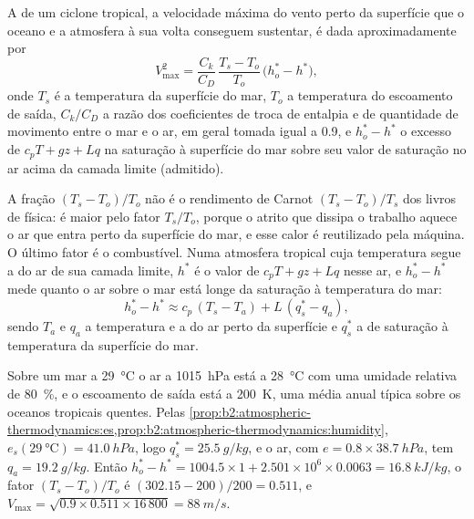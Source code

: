 \begin{proposition}\label{prop:b2:weather-systems:pi}
A \emph{} de um ciclone tropical, a velocidade máxima do vento perto da superfície que
o oceano e a atmosfera à sua volta conseguem sustentar, é dada aproximadamente por
\[
  V_{\max}^2 = \frac{C_k}{C_D}\,\frac{T_s - T_o}{T_o}\,\bigl(h_o^* - h^*\bigr),
\]
onde $T_s$ é a temperatura da superfície do mar, $T_o$ a temperatura do escoamento de saída, $C_k/C_D$
a razão dos coeficientes de troca de entalpia e de quantidade de movimento entre o mar e o ar,
em geral tomada igual a 0.9, e $h_o^* - h^*$ o excesso de $c_pT + gz + Lq$ na saturação à superfície
do mar sobre seu valor de saturação no ar acima da camada limite (admitido).
\end{proposition}

A fração $(T_s - T_o)/T_o$ não é o rendimento de Carnot $(T_s - T_o)/T_s$ dos livros de
física: é maior pelo fator $T_s/T_o$, porque o atrito que dissipa o trabalho aquece
o ar que entra perto da superfície do mar, e esse calor é reutilizado pela máquina. O último
fator é o combustível. Numa atmosfera tropical cuja temperatura segue a  do ar de sua
camada limite, $h^*$ é o valor de $c_pT + gz + Lq$ nesse ar, e $h_o^* - h^*$
mede quanto o ar sobre o mar está longe da saturação à temperatura do mar:
\[
  h_o^* - h^* \approx c_p\,(T_s - T_a) + L\,(q_s^* - q_a),
\]
sendo $T_a$ e $q_a$ a temperatura e a  do ar perto da superfície e
$q_s^*$ a  de saturação à temperatura da superfície do mar.

\begin{example}\label{ex:b2:weather-systems:pi}
Sobre um mar a \qty{29}{\celsius} o ar a \qty{1015}{hPa} está a \qty{28}{\celsius} com uma
umidade relativa de \qty{80}{\percent}, e o escoamento de saída está a \qty{200}{K}, uma média anual
típica sobre os oceanos tropicais quentes. Pelas \cref{prop:b2:atmospheric-thermodynamics:es,prop:b2:atmospheric-thermodynamics:humidity},
$e_s(\qty{29}{\celsius}) = \qty{41.0}{hPa}$, logo $q_s^* = \qty{25.5}{g/kg}$, e o ar, com
$e = 0.8 \times \qty{38.7}{hPa}$, tem $q_a = \qty{19.2}{g/kg}$. Então $h_o^* - h^* = 1004.5 \times
1 + 2.501 \times 10^6 \times 0.0063 = \qty{16.8}{kJ/kg}$, o fator $(T_s - T_o)/T_o$ é
$(302.15 - 200)/200 = 0.511$, e $V_{\max} = \sqrt{0.9 \times 0.511 \times 16\,800} =
\qty{88}{m/s}$.
\end{example}

